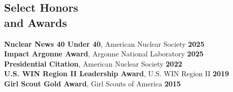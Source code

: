 \documentclass[margin,line]{resume}
\begin{document}
\begin{resume}
    \section{\mysidestyle Select Honors \\and Awards}
    \textbf{Nuclear News 40 Under 40}, American Nuclear Society \hfill \textbf{2025}\vspace{.5mm}\\
    \textbf{Impact Argonne Award}, Argonne National Laboratory \hfill \textbf{2025}\vspace{.5mm}\\
    \textbf{Presidential Citation}, American Nuclear Society \hfill \textbf{2022}\vspace{.5mm}\\
    \textbf{U.S. WIN Region II Leadership Award}, U.S. WIN Region II \hfill \textbf{2019}\vspace{.5mm}\\%
    \textbf{Girl Scout Gold Award}, Girl Scouts of America \hfill \textbf{2015}\vspace{.5mm}\\%
    \vspace{-7mm}


\end{resume}
\end{document}
